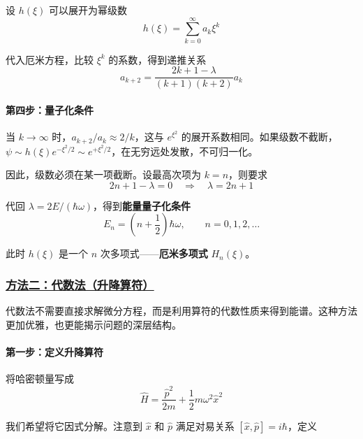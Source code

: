 设 $h(\xi)$ 可以展开为幂级数
\begin{equation}
    h(\xi) = \sum_{k=0}^{\infty} a_k \xi^k
\end{equation}

代入厄米方程，比较 $\xi^k$ 的系数，得到递推关系
\begin{equation}
    a_{k+2} = \frac{2k + 1 - \lambda}{(k+1)(k+2)}a_k
\end{equation}

\paragraph*{第四步：量子化条件}

当 $k \to \infty$ 时，$a_{k+2}/a_k \approx 2/k$，这与 $e^{\xi^2}$ 的展开系数相同。如果级数不截断，$\psi \sim h(\xi)e^{-\xi^2/2} \sim e^{+\xi^2/2}$，在无穷远处发散，不可归一化。

因此，级数必须在某一项截断。设最高次项为 $k = n$，则要求
\begin{equation}
    2n + 1 - \lambda = 0 \quad \Longrightarrow \quad \lambda = 2n + 1
\end{equation}

代回 $\lambda = 2E/(\hbar\omega)$，得到\textbf{能量量子化条件}
\begin{equation}
    \boxed{E_n = \left(n + \frac{1}{2}\right)\hbar\omega, \qquad n = 0, 1, 2, \ldots}
\end{equation}

此时 $h(\xi)$ 是一个 $n$ 次多项式——\textbf{厄米多项式} $H_n(\xi)$。

\subsubsection{\protect\hyperlink{:}{方法二：代数法（升降算符）}}

代数法不需要直接求解微分方程，而是利用算符的代数性质来得到能谱。这种方法更加优雅，也更能揭示问题的深层结构。

\paragraph*{第一步：定义升降算符}

将哈密顿量写成
\begin{equation}
    \hat{H} = \frac{\hat{p}^2}{2m} + \frac{1}{2}m\omega^2\hat{x}^2
\end{equation}

我们希望将它因式分解。注意到 $\hat{x}$ 和 $\hat{p}$ 满足对易关系 $[\hat{x}, \hat{p}] = i\hbar$，定义

